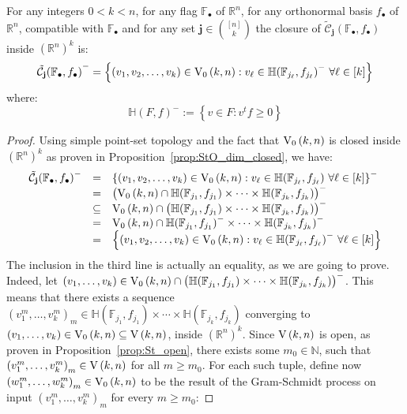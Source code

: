 \begin{lemma}\label{lem:closure_of_cells} For any integers $0<k<n$, for any flag $\mathbb{F}_{\bullet}$ of $\mathbb{R}^n$, for any orthonormal basis $f_{\bullet}$ of $\mathbb{R}^n$, compatible with $\mathbb{F}_{\bullet}$ and for any set $\mathbf{j}\in\binom{[n]}{k}$ the closure of $\tilde{\mathcal{C}}_{\mathbf{j}}{\left(\mathbb{F}_{\bullet},f_{\bullet}\right)}$ inside ${\left(\mathbb{R}^n\right)}^k$ is:
\[{\tilde{\mathcal{C}}_{\mathbf{j}}{\left(\mathbb{F}_{\bullet},f_{\bullet}\right)}}^-=\left\{(v_1,v_2,\ldots,v_k)\in\StO{k}{n}:v_{\ell}\in{\mathbb{H}(\mathbb{F}_{j_{\ell}},f_{j_{\ell}})}^-\ \forall\ell\in[k]\right\}\]
where:
\[{\mathbb{H}(F,f)}^-:=\left\{v\in F:v^tf\geq 0\right\}\]
\end{lemma}
\begin{proof} Using simple point-set topology and the fact that $\StO{k}{n}$ is closed inside ${\left(\mathbb{R}^n\right)}^k$ as proven in Proposition~\ref{prop:StO_dim_closed}, we have:
\[\begin{array}{rcl}\tilde{\mathcal{C}}_{\mathbf{j}}{\left(\mathbb{F}_{\bullet},f_{\bullet}\right)}^-
&=&{\left\{(v_1,v_2,\ldots,v_k)\in\StO{k}{n}:v_{\ell}\in\mathbb{H}(\mathbb{F}_{j_{\ell}},f_{j_{\ell}})\ \forall\ell\in[k]\right\}}^-\\
&=&{\big(\StO{k}{n}\cap\mathbb{H}(\mathbb{F}_{j_1},f_{j_1})\times\cdots\times\mathbb{H}(\mathbb{F}_{j_k},f_{j_k})\big)}^-\\
&\subseteq&\StO{k}{n}\cap{\big(\mathbb{H}(\mathbb{F}_{j_1},f_{j_1})\times\cdots\times\mathbb{H}(\mathbb{F}_{j_k},f_{j_k})\big)}^-\\
&=&\StO{k}{n}\cap\mathbb{H}{\left(\mathbb{F}_{j_1},f_{j_1}\right)}^-\times\cdots\times\mathbb{H}{\left(\mathbb{F}_{j_k},f_{j_k}\right)}^-\\
&=&\left\{(v_1,v_2,\ldots,v_k)\in\StO{k}{n}:v_{\ell}\in{\mathbb{H}(\mathbb{F}_{j_{\ell}},f_{j_{\ell}})}^-\ \forall\ell\in[k]\right\}\\
\end{array}\]
The inclusion in the third line is actually an equality, as we are going to prove. Indeed, let $(v_1,\ldots,v_k)\in\StO{k}{n}\cap{\big(\mathbb{H}(\mathbb{F}_{j_1},f_{j_1})\times\cdots\times\mathbb{H}(\mathbb{F}_{j_k},f_{j_k})\big)}^-$. This means that there exists a sequence ${(v_1^m,\ldots,v_k^m)}_m\in\mathbb{H}(\mathbb{F}_{j_1},f_{j_1})\times\cdots\times\mathbb{H}(\mathbb{F}_{j_k},f_{j_k})$ converging to $(v_1,\ldots,v_k)\in\StO{k}{n}\subseteq\St{k}{n}$, inside ${\left(\mathbb{R}^n\right)}^k$. Since $\St{k}{n}$ is open, as proven in Proposition~\ref{prop:St_open}, there exists some $m_0\in\mathbb{N}$, such that ${(v_1^m,\ldots,v_k^m)}_m\in\St{k}{n}$ for all $m\geq m_0$. For each such tuple, define now ${(w_1^m,\ldots,w_k^m)}_m\in\StO{k}{n}$ to be the result of the Gram-Schmidt process on input ${(v_1^m,\ldots,v_k^m)}_m$ for every $m\geq m_0$:

\end{proof}
